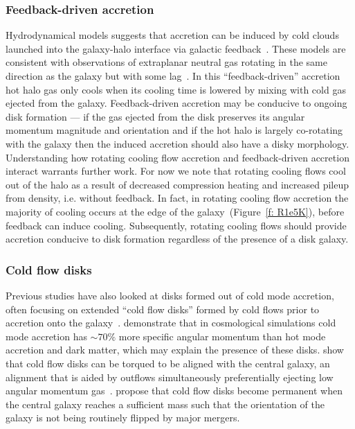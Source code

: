 \documentclass[fleqn,usenatbib]{mnras}
\begin{document}
\subsubsection{Feedback-driven accretion}
\label{s: other disk formation -- feedback-driven}

Hydrodynamical models suggests that accretion can be induced by cold clouds launched into the galaxy-halo interface via galactic feedback~\citep[e.g.][]{Marinacci2010, Marinacci2011, Marinacci2012, Armillotta2016a, Fraternali2017, Hobbs2020}.
These models are consistent with observations of extraplanar neutral gas rotating in the same direction as the galaxy but with some lag~\citep[e.g.][]{Fraternali2008,  Marasco2012}.
In this ``feedback-driven'' accretion hot halo gas only cools when its cooling time is lowered by mixing with cold gas ejected from the galaxy.
Feedback-driven accretion may be conducive to ongoing disk formation --- if the gas ejected from the disk preserves its angular momentum magnitude and orientation and if the hot halo is largely co-rotating with the galaxy then the induced accretion should also have a disky morphology.
Understanding how rotating cooling flow accretion and feedback-driven accretion interact warrants further work.
For now we note that rotating cooling flows cool out of the halo as a result of decreased compression heating and increased pileup from density, i.e. without feedback.
In fact, in rotating cooling flow accretion the majority of cooling occurs at the edge of the galaxy~(Figure~\ref{f: R1e5K}), before feedback can induce cooling.
Subsequently, rotating cooling flows should provide accretion conducive to disk formation regardless of the presence of a disk galaxy.

\subsubsection{Cold flow disks}
\label{s: other disk formation -- feedback-driven}

Previous studies have also looked at disks formed out of cold mode accretion, often focusing on extended ``cold flow disks'' formed by cold flows prior to accretion onto the galaxy~\citep[e.g.][]{Stewart2011a}.
\cite{Stewart2013} demonstrate that in cosmological simulations cold mode accretion has $\sim 70\%$ more specific angular momentum than hot mode accretion and dark matter, which may explain the presence of these disks.
\cite{Danovich2015} show that cold flow disks can be torqued to be aligned with the central galaxy, an alignment that is aided by outflows simultaneously preferentially ejecting low angular momentum gas~\citep[e.g.][]{Ubler2014}.
\cite{Dekel2020a} propose that cold flow disks become permanent when the central galaxy reaches a sufficient mass such that the orientation of the galaxy is not being routinely flipped by major mergers.
\end{document}
